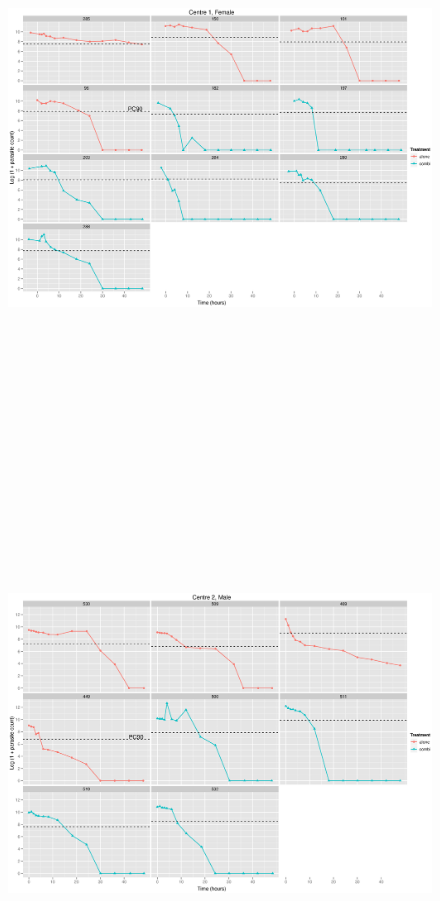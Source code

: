 \begin{figure}
\includegraphics[height=150mm]{Araw1F.eps}
\end{figure}
\begin{figure}
\includegraphics[height=150mm]{Araw2M.eps}
\end{figure}
